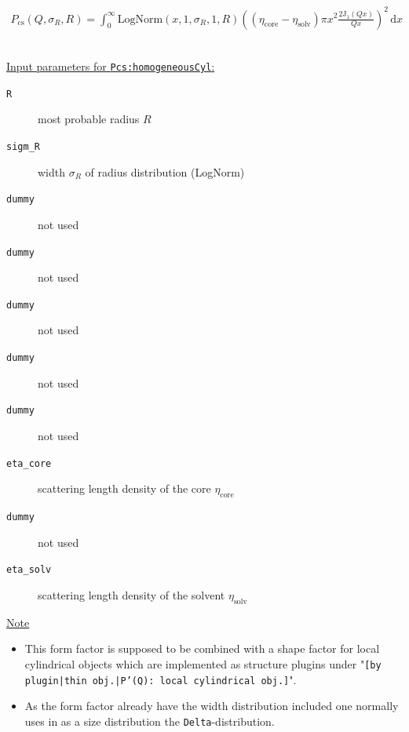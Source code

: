 \begin{align}
P_\text{cs}(Q,\sigma_{R},R) = \int_0^\infty \textrm{LogNorm}(x,1,\sigma_{R},1,R) \left( \left(\eta_\textrm{core}-\eta_\textrm{solv}\right) \pi x^2 \frac{2 \mathrm{J}_1(Qx)}{Qx} \right)^2 \, \textrm{d}x
\end{align}

\vspace{5mm}

\hspace{1pt}\\
\underline{Input parameters for \texttt{Pcs:homogeneousCyl}:}
\begin{description}
    \item[\texttt{R}] most probable radius $R$
    \item[\texttt{sigm\_R}] width $\sigma_R$ of radius distribution (LogNorm)
    \item[\texttt{dummy}] not used
    \item[\texttt{dummy}] not used
    \item[\texttt{dummy}] not used
    \item[\texttt{dummy}] not used
    \item[\texttt{dummy}] not used
    \item[\texttt{eta\_core}] scattering length density of the core $\eta_\textrm{core}$
    \item[\texttt{dummy}] not used
    \item[\texttt{eta\_solv}] scattering length density of the solvent $\eta_\textrm{solv}$
\end{description}

\noindent
\underline{Note}
\begin{itemize}
  \item This form factor is supposed to be combined with a shape factor for
local cylindrical objects which are implemented as structure  plugins
under "\texttt{[by plugin|thin obj.|P'(Q): local cylindrical obj.]}".
\item As the form factor already have the width distribution included one normally uses in \SASfit as a size distribution
the \texttt{Delta}-distribution.
\end{itemize}

